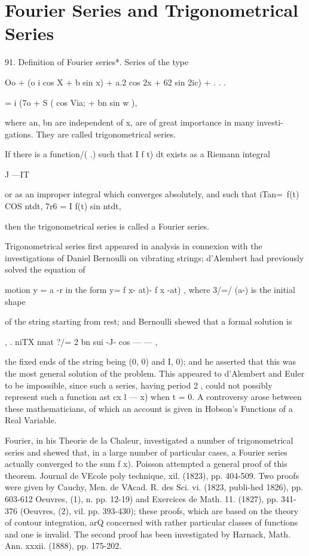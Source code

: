\chapter{Fourier Series and Trigonometrical Series} 

91. Definition of Fourier series*. Series of the type

 Oo + (o i cos X + b sin x) + a.2 cos 2x + 62 sin 2ic) + . . .

= i (7o + S ( cos Via; + bn sin w ),

where an, bn are independent of x, are of great importance in many
investi- gations. They are called trigonometrical series.

If there is a function/( .) such that I f t) dt exists as a Riemann
integral

J —IT

or as an improper integral which converges absolutely, and such that
iTan=\ f(t) COS ntdt, 7r6 = I f(t) sin ntdt,

then the trigonometrical series is called a Fourier series.

Trigonometrical series first appeared in analysis in connexion with
the investigations of Daniel Bernoulli on vibrating strings;
d'Alembert had previously solved the equation of

motion y = a -r in the form y= f x- at)- f x -at) , where 3/=/ (a-) is
the initial shape

of the string starting from rest; and Bernoulli shewed that a formal
solution is

  , . niTX nnat ?/= 2 bn sui -J- cos — — ,

the fixed ends of the string being (0, 0) and I, 0); and he asserted
that this was the most general solution of the problem. This appeared
to d'Alembert and Euler to be impossible, since such a series, having
period 2 , could not possibly represent such a function ast cx l — x)
when t = 0. A controversy arose between these mathematicians, of which
an account is given in Hobson's Functions of a Real Variable.

Fourier, in his Theorie de la Chaleur, investigated a number of
trigonometrical series and shewed that, in a large number of
particular cases, a Fourier series actually converged to the sum f x).
Poisson attempted a general proof of this theorem. Journal de VEcole
poly technique, xil. (1823), pp. 404-509. Two proofs were given by
Cauchy, Men. de VAcad. R. des Sci. vi. (1823, publi-hed 1826), pp.
603-612 Oeuvres, (1), n. pp. 12-19) and Exercices de Math. 11. (1827),
pp. 341-376 (Oeuvres, (2), vil. pp. 393-430); these proofs, which are
based on the theory of contour integration, arQ concerned with rather
particular classes of functions and one is invalid. The second proof
has been investigated by Harnack, Math. Ann. xxxii. (1888), pp.
175-202.

